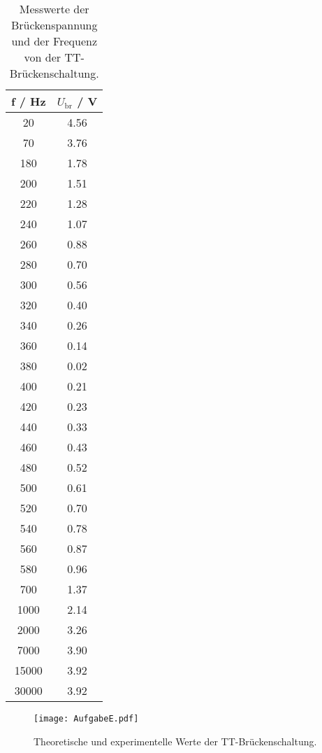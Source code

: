\begin{table}[H] %
  \centering
  \begin{tabular}{c c}
    \toprule
    f / Hz & $U_\text{br}$ / V \\
    \midrule
      20	  &  4.56  \\
      70	  &  3.76  \\
      180	  &  1.78  \\
      200	  &  1.51  \\
      220	  &  1.28  \\
      240	  &  1.07  \\
      260	  &  0.88  \\
      280	  &  0.70  \\
      300	  &  0.56  \\
      320	  &  0.40  \\
      340	  &  0.26  \\
      360	  &  0.14  \\
      380	  &  0.02  \\
      400	  &  0.21  \\
      420	  &  0.23  \\
      440	  &  0.33  \\
      460	  &  0.43  \\
      480	  &  0.52  \\
      500	  &  0.61  \\
      520	  &  0.70  \\
      540	  &  0.78  \\
      560	  &  0.87  \\
      580	  &  0.96  \\
      700	  &  1.37  \\
      1000	&  2.14  \\
      2000	&  3.26  \\
      7000	&  3.90  \\
      15000	&  3.92  \\
      30000	&  3.92  \\
  \end{tabular}
  \caption{Messwerte der Brückenspannung und der Frequenz von der TT-Brückenschaltung.}
  \label{tab:TT-Brucke}
\end{table}

\begin{figure}[H]
  \centering
  \texttt{[image: AufgabeE.pdf]}
  \caption{Theoretische und experimentelle Werte der TT-Brückenschaltung.}
  \label{fig:AufgabeE}
\end{figure}

